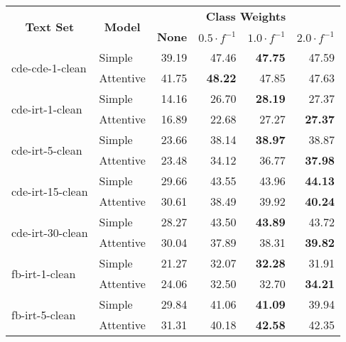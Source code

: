 \begin{tabular}{| l | l | r | r | r | r |}
    \hline

    \multicolumn{1}{|c|}{\multirow{2}{*}{\textbf{Text Set}}} &
    \multicolumn{1}{|c|}{\multirow{2}{*}{\textbf{Model}}} &
    \multicolumn{4}{|c|}{\textbf{Class Weights}} \\

    &
    &
    \multicolumn{1}{|c|}{\textbf{None}} &
    \multicolumn{1}{|c|}{\textbf{$0.5 \cdot f^{-1}$}} &
    \multicolumn{1}{|c|}{\textbf{$1.0 \cdot f^{-1}$}} &
    \multicolumn{1}{|c|}{\textbf{$2.0 \cdot f^{-1}$}} \\

    \hline \hline

    \multirow{2}{*}{cde-cde-1-clean}
    & Simple    & 39.19 & 47.46 & \textbf{47.75} & 47.59 \\
    & Attentive & 41.75 & \textbf{48.22} & 47.85 & 47.63 \\ \hline

    \multirow{2}{*}{cde-irt-1-clean}
    & Simple    & 14.16 & 26.70 & \textbf{28.19} & 27.37 \\
    & Attentive & 16.89 & 22.68 & 27.27 & \textbf{27.37} \\ \hline

    \multirow{2}{*}{cde-irt-5-clean}
    & Simple    & 23.66 & 38.14 & \textbf{38.97} & 38.87 \\
    & Attentive & 23.48 & 34.12 & 36.77 & \textbf{37.98} \\ \hline

    \multirow{2}{*}{cde-irt-15-clean}
    & Simple    & 29.66 & 43.55 & 43.96 & \textbf{44.13} \\
    & Attentive & 30.61 & 38.49 & 39.92 & \textbf{40.24} \\ \hline

    \multirow{2}{*}{cde-irt-30-clean}
    & Simple    & 28.27 & 43.50 & \textbf{43.89} & 43.72 \\
    & Attentive & 30.04 & 37.89 & 38.31 & \textbf{39.82} \\ \hline \hline

    \multirow{2}{*}{fb-irt-1-clean}
    & Simple    & 21.27 & 32.07 & \textbf{32.28} & 31.91 \\
    & Attentive & 24.06 & 32.50 & 32.70 & \textbf{34.21} \\ \hline

    \multirow{2}{*}{fb-irt-5-clean}
    & Simple    & 29.84 & 41.06 & \textbf{41.09} & 39.94 \\
    & Attentive & 31.31 & 40.18 & \textbf{42.58} & 42.35 \\ \hline


\end{tabular}
